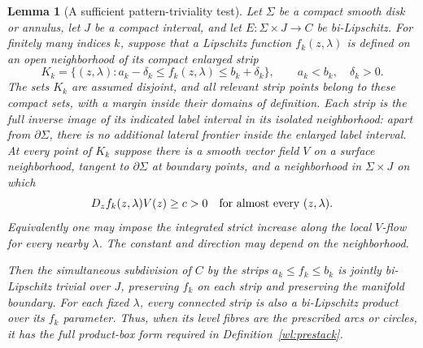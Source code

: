 \documentclass[11pt]{article}
\numberwithin{equation}{section}
\newtheorem{lemma}[theorem]{Lemma}
\theoremstyle{definition}
\theoremstyle{remark}
\begin{document}
\begin{lemma}[A sufficient pattern-triviality test]\label{wl:pattern}
Let $\Sigma$ be a compact smooth disk or annulus, let $J$ be a compact
interval, and let $E:\Sigma\times J\to C$ be bi-Lipschitz.
For finitely many indices $k$, suppose that a Lipschitz function
$f_k(z,\lambda)$ is defined on an open neighborhood of its compact
enlarged strip
\[
 K_k=\{(z,\lambda):a_k-\delta_k\leq f_k(z,\lambda)
                         \leq b_k+\delta_k\},
 \qquad a_k<b_k,\quad\delta_k>0.
\]
The sets $K_k$ are assumed disjoint, and all relevant strip points
belong to these compact sets, with a margin inside their domains of
definition.  Each strip is the full inverse image of its indicated
label interval in its isolated neighborhood: apart from
$\partial\Sigma$, there is no additional lateral frontier inside
the enlarged label interval.  At every point of $K_k$ suppose there is a smooth vector
field $V$ on a surface neighborhood, tangent to $\partial\Sigma$ at
boundary points, and a neighborhood in $\Sigma\times J$ on which
\[
 D_z f_k(z,\lambda)V(z)\geq c>0
 \quad\hbox{for almost every }(z,\lambda).
\]
Equivalently one may impose the integrated strict increase
along the local $V$-flow for every nearby $\lambda$.
The constant and direction may depend on the neighborhood.

Then the simultaneous subdivision of $C$ by the strips
$a_k\leq f_k\leq b_k$ is jointly bi-Lipschitz trivial over $J$,
preserving $f_k$ on each strip and preserving the manifold boundary.
For each fixed $\lambda$, every connected strip is also a
bi-Lipschitz product over its $f_k$ parameter.  Thus, when its level
fibres are the prescribed arcs or circles, it has the full product-box
form required in Definition~\ref{wl:prestack}.
\end{lemma}
\end{document}
